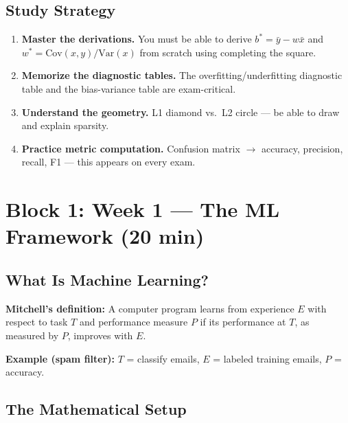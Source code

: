 \documentclass[11pt,a4paper]{article}
\begin{document}
\subsection{Study Strategy}

\begin{enumerate}
    \item \textbf{Master the derivations.} You must be able to derive $b^* = \bar{y} - w\bar{x}$ and $w^* = \text{Cov}(x,y)/\text{Var}(x)$ from scratch using completing the square.
    \item \textbf{Memorize the diagnostic tables.} The overfitting/underfitting diagnostic table and the bias-variance table are exam-critical.
    \item \textbf{Understand the geometry.} L1 diamond vs.\ L2 circle --- be able to draw and explain sparsity.
    \item \textbf{Practice metric computation.} Confusion matrix $\to$ accuracy, precision, recall, F1 --- this appears on every exam.
\end{enumerate}

\section{Block 1: Week 1 --- The ML Framework (20 min)}

\subsection{What Is Machine Learning?}

\textbf{Mitchell's definition:} A computer program learns from experience $E$ with respect to task $T$ and performance measure $P$ if its performance at $T$, as measured by $P$, improves with $E$.

\textbf{Example (spam filter):} $T$ = classify emails, $E$ = labeled training emails, $P$ = accuracy.

\subsection{The Mathematical Setup}
\end{document}
